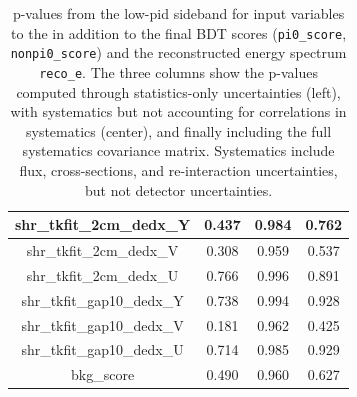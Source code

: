 \begin{table}[H]
\begin{tabular}{| c | c | c | c | }
shr\_tkfit\_2cm\_dedx\_Y & 0.437 & 0.984 & 0.762 \\ \hline
shr\_tkfit\_2cm\_dedx\_V & 0.308 & 0.959 & 0.537 \\ \hline
shr\_tkfit\_2cm\_dedx\_U & 0.766 & 0.996 & 0.891 \\ \hline
shr\_tkfit\_gap10\_dedx\_Y & 0.738 & 0.994 & 0.928 \\ \hline
shr\_tkfit\_gap10\_dedx\_V & 0.181 & 0.962 & 0.425 \\ \hline
shr\_tkfit\_gap10\_dedx\_U & 0.714 & 0.985 & 0.929 \\ \hline
bkg\_score & 0.490 & 0.960 & 0.627 \\ \hline
 \end{tabular}
 \caption{\label{tab:1e0p:LPID:pvalues}p-values from the low-pid \zpsel sideband for input variables to the \zpsel in addition to the final BDT scores (\texttt{pi0\_score}, \texttt{nonpi0\_score}) and the reconstructed energy spectrum \texttt{reco\_e}. The three columns show the p-values computed through statistics-only uncertainties (left), with systematics but not accounting for correlations in systematics (center), and finally including the full systematics covariance matrix. Systematics include flux, cross-sections, and re-interaction uncertainties, but not detector uncertainties.}
\end{table}
